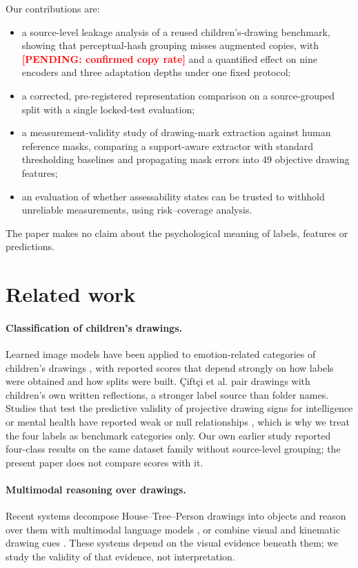 \documentclass[pdflatex,sn-mathphys-num]{sn-jnl}
\newcommand{\pending}[1]{\textcolor{red}{\textbf{[PENDING: #1]}}}
\begin{document}
Our contributions are:
\begin{itemize}
\item a source-level leakage analysis of a reused children's-drawing benchmark, showing that perceptual-hash grouping misses augmented copies, with \pending{confirmed copy rate} and a quantified effect on nine encoders and three adaptation depths under one fixed protocol;
\item a corrected, pre-registered representation comparison on a source-grouped split with a single locked-test evaluation;
\item a measurement-validity study of drawing-mark extraction against human reference masks, comparing a support-aware extractor with standard thresholding baselines and propagating mask errors into 49 objective drawing features;
\item an evaluation of whether assessability states can be trusted to withhold unreliable measurements, using risk--coverage analysis.
\end{itemize}
The paper makes no claim about the psychological meaning of labels, features or predictions.

\section{Related work}\label{sec:related}

\paragraph{Classification of children's drawings.} Learned image models have been applied to emotion-related categories of children's drawings \cite{ali2022sensing,ciftci2025kido}, with reported scores that depend strongly on how labels were obtained and how splits were built. \c{C}ift\c{c}i et al. \cite{ciftci2025kido} pair drawings with children's own written reflections, a stronger label source than folder names. Studies that test the predictive validity of projective drawing signs for intelligence or mental health have reported weak or null relationships \cite{imuta2013drawing,lin2022htp}, which is why we treat the four labels as benchmark categories only. Our own earlier study \cite{mjeer2026prior} reported four-class results on the same dataset family without source-level grouping; the present paper does not compare scores with it.

\paragraph{Multimodal reasoning over drawings.} Recent systems decompose House--Tree--Person drawings into objects and reason over them with multimodal language models \cite{ma2025pick,psydraw2024}, or combine visual and kinematic drawing cues \cite{binaei2026artcognition}. These systems depend on the visual evidence beneath them; we study the validity of that evidence, not interpretation.
\end{document}
